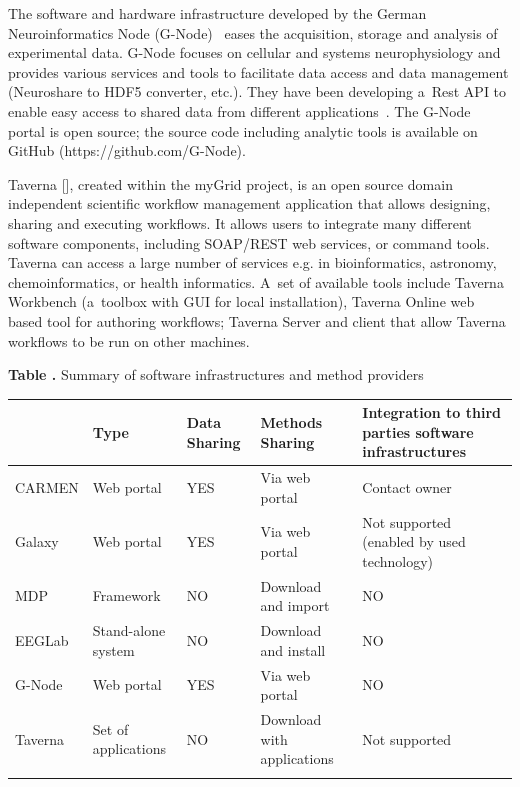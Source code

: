 \documentclass{frontiersSCNS} %
\begin{document}
The software and hardware infrastructure developed by the German Neuroinformatics Node (G-Node)~\cite{Herz08, GNode} eases the acquisition, storage and analysis of experimental data. G-Node focuses on cellular and systems neurophysiology and provides various services and tools to facilitate data access and data management (Neuroshare \cite{Neuroshare} to HDF5 converter, etc.). They have been developing a~Rest API to enable easy access to shared data from different applications~\cite{Sobolev14}. The G-Node portal is open source; the source code including analytic tools is available on GitHub (https://github.com/G-Node).

Taverna [], created within the myGrid project, is an open source domain independent scientific workflow management application that allows designing, sharing and executing workflows. It allows users to integrate many different software components, including SOAP/REST web services, or command tools. Taverna can access a large number of services e.g. in bioinformatics, astronomy, chemoinformatics, or health informatics. A~set of available tools include Taverna Workbench (a~toolbox with GUI for local installation), Taverna Online web based tool for authoring workflows; Taverna Server and client that allow Taverna workflows to be run on other machines.

\begin{table}[!t]
\textbf{\label{Tab:01} Table .}{ Summary of software infrastructures and method providers }

\processtable{ }
{\begin{tabular}{lllll}\toprule
 & Type & Data Sharing & Methods Sharing & Integration to third parties software infrastructures \\\midrule

CARMEN & Web portal & YES & Via web portal & Contact owner\\\midrule
Galaxy &  Web portal & YES & Via web portal & Not supported (enabled by used technology)\\\midrule
MDP & Framework & NO & Download and import & NO\\\midrule
EEGLab & Stand-alone system & NO & Download and install & NO\\\midrule
G-Node & Web portal & YES & Via web portal & NO\\\midrule
Taverna & Set of applications & NO & Download with applications & Not supported\\\botrule
\end{tabular}}{}
\end{table}
\end{document}
